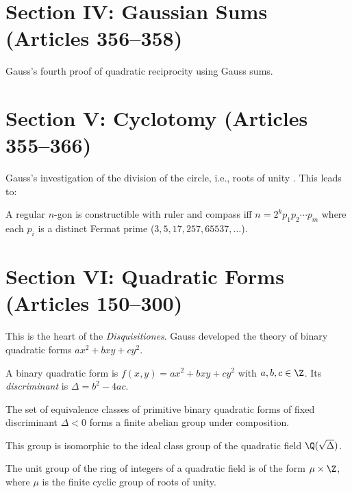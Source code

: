 \section{Section IV: Gaussian Sums (Articles 356--358)}

Gauss's fourth proof of quadratic reciprocity using Gauss sums.

\section{Section V: Cyclotomy (Articles 355--366)}

Gauss's investigation of the division of the circle, i.e., roots of unity . This leads to:

\begin{theorem}
A regular $n$-gon is constructible with ruler and compass iff $n = 2^k p_1 p_2 \cdots p_m$ where each $p_i$ is a distinct Fermat prime  ($3, 5, 17, 257, 65537, \ldots$).
\end{theorem}

\section{Section VI: Quadratic Forms (Articles 150--300)}

This is the heart of the \textit{Disquisitiones}. Gauss developed the theory of binary quadratic forms $ax^2 + bxy + cy^2$.

\begin{definition}
A binary quadratic form is $f(x,y) = ax^2 + bxy + cy^2$ with $a,b,c \in \Z$. Its \textit{discriminant}  is $\Delta = b^2 - 4ac$.
\end{definition}

\begin{theorem}
The set of equivalence classes of primitive binary quadratic forms of fixed discriminant $\Delta < 0$ forms a finite abelian group under composition.
\end{theorem}

This group is isomorphic to the ideal class group   of the quadratic field $\Q(\sqrt{\Delta})$.

\begin{theorem}
The unit group of the ring of integers of a quadratic field is of the form $\mu \times \Z$, where $\mu$ is the finite cyclic group of roots of unity.
\end{theorem}

